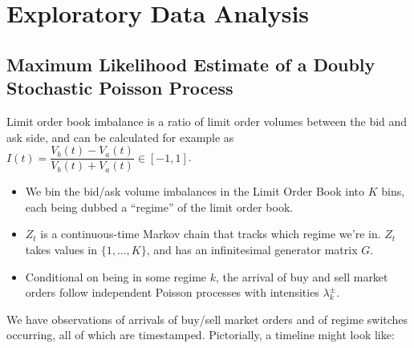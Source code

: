 \chapter{Exploratory Data Analysis}

\section{Maximum Likelihood Estimate of a Doubly Stochastic Poisson Process}

Limit order book imbalance is a ratio of limit order volumes between the bid and ask side, and can be calculated for example as $I(t) = \dfrac{V_b(t) - V_a(t)}{V_b(t) + V_a(t)} \in [-1,1]$.
\begin{itemize}
\item We bin the bid/ask volume imbalances in the Limit Order Book into $K$ bins, each being dubbed a ``regime'' of the limit order book. 
\item $Z_t$ is a continuous-time Markov chain that tracks which regime we're in. $Z_t$ takes values in $\{1, \dots , K\}$, and has an infinitesimal generator matrix $G$.
\item Conditional on being in some regime $k$, the arrival of buy and sell market orders follow independent Poisson processes with intensities $\lambda^{\pm}_k$.
\end{itemize}

We have observations of arrivals of buy/sell market orders and of regime switches occurring, all of which are timestamped. Pictorially, a timeline might look like:

